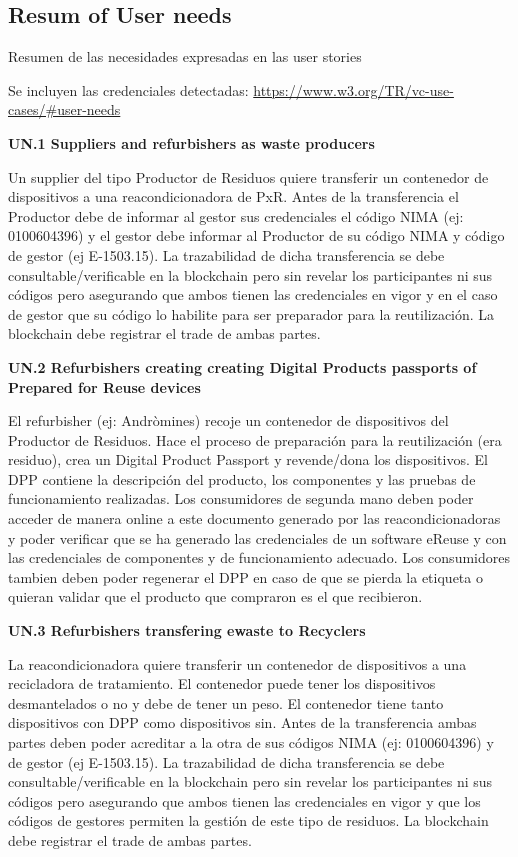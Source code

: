 \documentclass[
]{book}
\begin{document}
\hypertarget{resum-of-user-needs}{%
\subsection{Resum of User needs}\label{resum-of-user-needs}}

Resumen de las necesidades expresadas en las user stories

Se incluyen las credenciales detectadas: \url{https://www.w3.org/TR/vc-use-cases/\#user-needs}

\textbf{UN.1 Suppliers and refurbishers as waste producers}

Un supplier del tipo Productor de Residuos quiere transferir un contenedor de dispositivos a una reacondicionadora de PxR. Antes de la transferencia el Productor debe de informar al gestor sus credenciales el código NIMA (ej: 0100604396) y el gestor debe informar al Productor de su código NIMA y código de gestor (ej E-1503.15). La trazabilidad de dicha transferencia se debe consultable/verificable en la blockchain pero sin revelar los participantes ni sus códigos pero asegurando que ambos tienen las credenciales en vigor y en el caso de gestor que su código lo habilite para ser preparador para la reutilización. La blockchain debe registrar el trade de ambas partes.

\textbf{UN.2 Refurbishers creating creating Digital Products passports of Prepared for Reuse devices}

El refurbisher (ej: Andròmines) recoje un contenedor de dispositivos del Productor de Residuos. Hace el proceso de preparación para la reutilización (era residuo), crea un Digital Product Passport y revende/dona los dispositivos. El DPP contiene la descripción del producto, los componentes y las pruebas de funcionamiento realizadas. Los consumidores de segunda mano deben poder acceder de manera online a este documento generado por las reacondicionadoras y poder verificar que se ha generado las credenciales de un software eReuse y con las credenciales de componentes y de funcionamiento adecuado. Los consumidores tambien deben poder regenerar el DPP en caso de que se pierda la etiqueta o quieran validar que el producto que compraron es el que recibieron.

\textbf{UN.3 Refurbishers transfering ewaste to Recyclers}

La reacondicionadora quiere transferir un contenedor de dispositivos a una recicladora de tratamiento. El contenedor puede tener los dispositivos desmantelados o no y debe de tener un peso. El contenedor tiene tanto dispositivos con DPP como dispositivos sin. Antes de la transferencia ambas partes deben poder acreditar a la otra de sus códigos NIMA (ej: 0100604396) y de gestor (ej E-1503.15). La trazabilidad de dicha transferencia se debe consultable/verificable en la blockchain pero sin revelar los participantes ni sus códigos pero asegurando que ambos tienen las credenciales en vigor y que los códigos de gestores permiten la gestión de este tipo de residuos. La blockchain debe registrar el trade de ambas partes.
\end{document}
